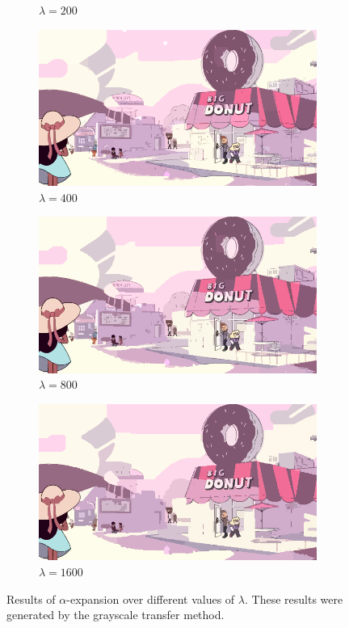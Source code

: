 \documentclass[10pt,twocolumn,letterpaper]{article}
\begin{document}
\begin{figure}
\begin{subfigure}{.48\linewidth}
\caption{$\lambda = 200$}\label{fig:transfer200}
\end{subfigure}
\begin{subfigure}{.48\linewidth}
\includegraphics[width=\linewidth]{alphaResults/transfered_400_001_09.png}
\caption{$\lambda = 400$}\label{fig:transfer400}
\end{subfigure}
\begin{subfigure}{.48\linewidth}
\includegraphics[width=\linewidth]{alphaResults/transfered_800_001_11.png}
\caption{$\lambda = 800$}\label{fig:transfer800}
\end{subfigure}
\begin{subfigure}{.48\linewidth}
\includegraphics[width=\linewidth]{alphaResults/transfered_1600_001_10.png}
\caption{$\lambda = 1600$}\label{fig:transfer1600}
\end{subfigure}
\caption{Results of $\alpha$-expansion over different values of $\lambda$. These results were generated by the grayscale transfer method.}
\label{fig:alphaResultsFull}
\end{figure}
\end{document}
